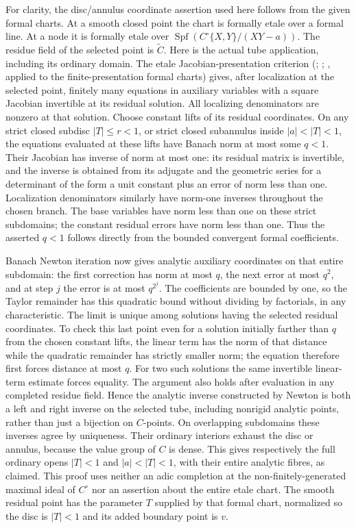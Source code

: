 \documentclass[11pt]{article}
\begin{document}
\begin{enumerate}
For clarity, the disc/annulus coordinate assertion used here follows
from the given formal charts. At a smooth closed point the chart is
formally etale over a formal line. At a node it is formally etale over
$\operatorname{Spf}(C^\circ\{X,Y\}/(XY-a))$.
The residue field of the selected point is $\widetilde C$. Here is
the actual tube application, including its ordinary domain. The
etale Jacobian-presentation criterion
(\cite[IV, 17.6]{EGA}; \cite[I.5.3.11]{FK};
\cite[Tags 00UE and 0ALI]{Stacks}, applied to the finite-presentation
formal charts) gives, after localization at the selected point, finitely
many equations in auxiliary variables with a square Jacobian
invertible at its residual solution. All localizing denominators
are nonzero at that solution. Choose constant lifts of its residual
coordinates. On any strict closed subdisc $|T|\leq r<1$, or strict
closed subannulus inside $|a|<|T|<1$, the equations evaluated at
these lifts have Banach norm at most some $q<1$. Their Jacobian
has inverse of norm at most one: its residual matrix is invertible,
and the inverse is obtained from its adjugate and the geometric
series for a determinant of the form a unit constant plus an error
of norm less than one. Localization denominators similarly have
norm-one inverses throughout the chosen branch. The base variables
have norm less than one on these strict subdomains; the constant
residual errors have norm less than one. Thus the asserted $q<1$
follows directly from the bounded convergent formal coefficients.

Banach Newton iteration now gives analytic auxiliary coordinates
on that entire subdomain: the first correction has norm at most
$q$, the next error at most $q^2$, and at step $j$ the error is
at most $q^{2^j}$. The coefficients are bounded by one, so the
Taylor remainder has this quadratic bound without dividing by
factorials, in any characteristic. The limit is unique among
solutions having the selected residual coordinates. To check this
last point even for a solution initially farther than $q$ from
the chosen constant lifts, the linear term has the norm of that
distance while the quadratic remainder has strictly smaller norm;
the equation therefore first forces distance at most $q$.
For two such solutions the same invertible linear-term estimate
forces equality. The argument also holds after evaluation in any
completed residue field. Hence the analytic inverse constructed by
Newton is both a left and right inverse on the selected tube,
including nonrigid analytic points, rather than just a bijection
on $C$-points. On overlapping subdomains these inverses agree by
uniqueness. Their ordinary interiors exhaust the disc or annulus,
because the value group of $C$ is dense. This gives respectively
the full ordinary opens $|T|<1$ and $|a|<|T|<1$, with their
entire analytic fibres, as claimed. This proof uses neither an
adic completion at the non-finitely-generated maximal ideal of
$C^\circ$ nor an assertion about the entire etale chart.
The smooth residual point has the parameter $T$ supplied by that
formal chart, normalized so the disc is $|T|<1$ and its added
boundary point is $v$.


\end{enumerate}
\end{document}

